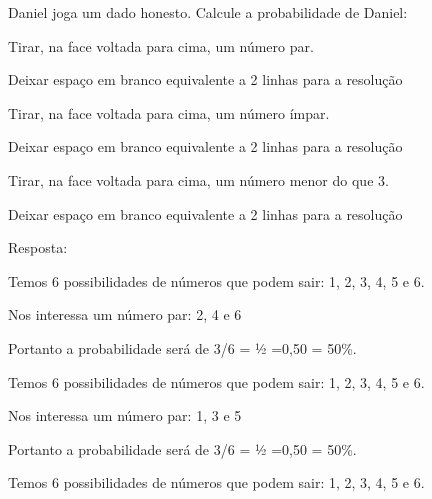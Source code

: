 \begin{escolha}
\begin{escolha}
Daniel joga um dado honesto. Calcule a probabilidade de Daniel:

\begin{escolha}

\item
  Tirar, na face voltada para cima, um número par.
\end{escolha}

Deixar espaço em branco equivalente a 2 linhas para a resolução

\begin{escolha}

\item
  Tirar, na face voltada para cima, um número ímpar.
\end{escolha}

Deixar espaço em branco equivalente a 2 linhas para a resolução

\begin{escolha}

\item
  Tirar, na face voltada para cima, um número menor do que 3.
\end{escolha}

Deixar espaço em branco equivalente a 2 linhas para a resolução

Resposta:

\begin{escolha}

\item
  Temos 6 possibilidades de números que podem sair: 1, 2, 3, 4, 5 e 6.
\end{escolha}

Nos interessa um número par: 2, 4 e 6

Portanto a probabilidade será de 3/6 = ½ =0,50 = 50\%.

\begin{escolha}

\item
  Temos 6 possibilidades de números que podem sair: 1, 2, 3, 4, 5 e 6.
\end{escolha}

Nos interessa um número par: 1, 3 e 5

Portanto a probabilidade será de 3/6 = ½ =0,50 = 50\%.

\begin{escolha}

\item
  Temos 6 possibilidades de números que podem sair: 1, 2, 3, 4, 5 e 6.
\end{escolha}


\end{escolha}
\end{escolha}
